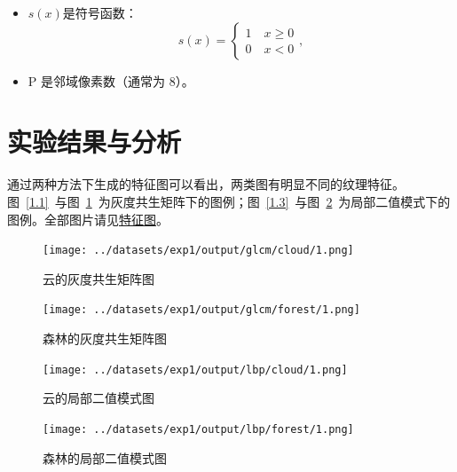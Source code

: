 \documentclass[a4paper,12pt]{report}
\begin{document}
\begin{itemize}
    \item $s(x)$是符号函数：
    $$s(x)=\left\{ \begin{array}{rcl}1\quad x\ge 0\\0\quad x<0\end{array}\right.,$$
    \item P 是邻域像素数（通常为 8）。
\end{itemize}
\section{实验结果与分析}
\par 通过两种方法下生成的特征图可以看出，两类图有明显不同的纹理特征。图~\ref{1.1}\ 与图~\ref{1.2}\ 为灰度共生矩阵下的图例；图~\ref{1.3}\ 与图~\ref{1.4}\ 为局部二值模式下的图例。全部图片请见\href{https://github.com/psa1K/Data_mining_2024/tree/main/datasets/exp1/output}{特征图}。
\begin{figure}[htbp]
    \centering
    \begin{minipage}{0.42\textwidth}
        \centering
        \texttt{[image: ../datasets/exp1/output/glcm/cloud/1.png]}
        \caption{云的灰度共生矩阵图}
        \label{1.1}
    \end{minipage}
    \hfill
    \begin{minipage}{0.42\textwidth}
        \centering
        \texttt{[image: ../datasets/exp1/output/glcm/forest/1.png]}
        \caption{森林的灰度共生矩阵图}
        \label{1.2}
    \end{minipage}
\end{figure}
\begin{figure}[htbp]
    \centering
    \begin{minipage}{0.42\textwidth}
        \centering
        \texttt{[image: ../datasets/exp1/output/lbp/cloud/1.png]}
        \caption{云的局部二值模式图}
        \label{1.3}
    \end{minipage}
    \hfill
    \begin{minipage}{0.42\textwidth}
        \centering
        \texttt{[image: ../datasets/exp1/output/lbp/forest/1.png]}
        \caption{森林的局部二值模式图}
        \label{1.4}
    \end{minipage}
\end{figure}
\end{document}
